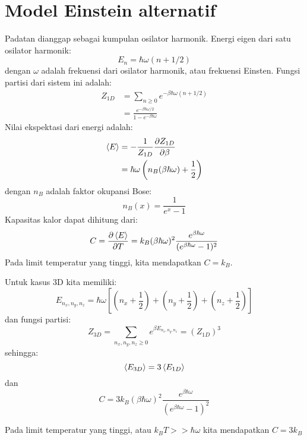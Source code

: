 \section{Model Einstein alternatif}

Padatan dianggap sebagai kumpulan osilator harmonik.
Energi eigen dari satu osilator harmonik:
\begin{equation}
E_{n} = \hbar \omega ( n + 1/2 )
\end{equation}
dengan $\omega$ adalah frekuensi dari osilator harmonik, atau
frekuensi Einsten.
Fungsi partisi dari sistem ini adalah:
\begin{align*}
Z_{1D} & = \sum_{n \geq 0} e^{-\beta\hbar\omega(n + 1/2)} \\
& = \frac{e^{-\beta\hbar\omega/2}}{1 - e^{-\beta\hbar\omega}}
\end{align*}
Nilai ekspektasi dari energi adalah:
\begin{align*}
\braket{E} & = -\frac{1}{Z_{1D}}\frac{\partial Z_{1D}}{\partial \beta} \\
& = \hbar \omega \left( n_{B}(\beta\hbar\omega) + \frac{1}{2} \right)
\end{align*}
dengan $n_{B}$ adalah faktor okupansi Bose:
\begin{equation}
n_{B}(x) = \frac{1}{e^{x} - 1}
\end{equation}
Kapasitas kalor dapat dihitung dari:
\begin{equation}
C = \frac{\partial \braket{E}}{\partial T} = k_{B} (\beta \hbar \omega )^2
\frac{e^{\beta\hbar\omega}}{(e^{\beta\hbar\omega} - 1)^2}
\end{equation}
Pada limit temperatur yang tinggi, kita mendapatkan $C = k_{B}$.

Untuk kasus 3D kita memiliki:
\begin{equation*}
E_{n_x,n_y,n_z} = \hbar \omega \left[
\left(n_x + \frac{1}{2}\right) +
\left(n_y + \frac{1}{2}\right) +
\left(n_z + \frac{1}{2}\right)
\right]
\end{equation*}
dan fungsi partisi:
\begin{equation*}
Z_{3D} = \sum_{n_x,n_y,n_z \geq 0} e^{\beta E_{n_x,n_y,n_z}} = (Z_{1D})^{3}
\end{equation*}
sehingga:
\begin{equation*}
\braket{E_{3D}} = 3\braket{E_{1D}}
\end{equation*}
dan
\begin{equation*}
C = 3 k_{B} (\beta \hbar \omega )^2
\frac{e^{\beta\hbar\omega}}{(e^{\beta\hbar\omega} - 1)^2}
\end{equation*}

Pada limit temperatur yang tinggi, atau $k_{B}T >> \hbar \omega$ kita
mendapatkan $C = 3k_{B}$
